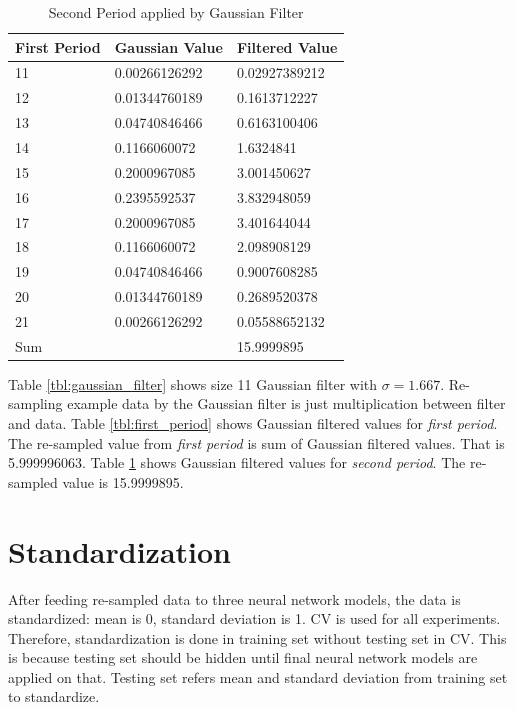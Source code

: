 \documentclass[draft,dvipsnames]{drexel-thesis}
\begin{document}
\begin{thesis}
\begin{table}[!t]
\centering
\caption{Second Period applied by Gaussian Filter}
\label{tbl:second_period}
\begin{tabular}{|l|l|l|}
\hline
First Period & Gaussian Value & Filtered Value \\ \hline
11           & 0.00266126292  & 0.02927389212  \\
12           & 0.01344760189  & 0.1613712227   \\
13           & 0.04740846466  & 0.6163100406   \\
14           & 0.1166060072   & 1.6324841      \\
15           & 0.2000967085   & 3.001450627    \\
16           & 0.2395592537   & 3.832948059    \\
17           & 0.2000967085   & 3.401644044    \\
18           & 0.1166060072   & 2.098908129    \\
19           & 0.04740846466  & 0.9007608285   \\
20           & 0.01344760189  & 0.2689520378   \\
21           & 0.00266126292  & 0.05588652132  \\ \hline
\multicolumn{2}{|l|}{Sum}     & 15.9999895     \\ \hline
\end{tabular}
\end{table}

Table \ref{tbl:gaussian_filter} shows size 11 Gaussian filter with $\sigma=1.667$. Re-sampling example data by the Gaussian filter is just multiplication between filter and data. Table \ref{tbl:first_period} shows Gaussian filtered values for {\em first period}. The re-sampled value from {\em first period} is sum of Gaussian filtered values. That is 5.999996063. Table \ref{tbl:second_period} shows Gaussian filtered values for {\em second period}. The re-sampled value is 15.9999895.


\section{Standardization}
After feeding re-sampled data to three neural network models, the data is standardized: mean is 0, standard deviation is 1. CV is used for all experiments. Therefore, standardization is done in training set without testing set in CV. This is because testing set should be hidden until final neural network models are applied on that. Testing set refers mean and standard deviation from training set to standardize.



\end{thesis}
\end{document}
